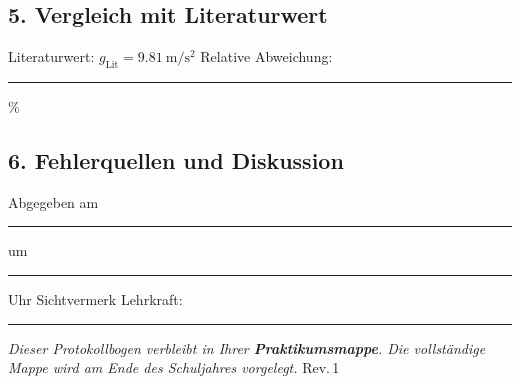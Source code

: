 \documentclass[11pt,a4paper]{scrartcl}
\begin{document}
	\vspace{0.3cm}
	
	\subsection*{5. Vergleich mit Literaturwert}
	
	Literaturwert: $g_{\text{Lit}} = \SI{9,81}{\metre\per\second\squared}$ \hfill Relative Abweichung: \rule{3cm}{0.4pt} \%
	
	\vspace{0.5cm}
	
	\subsection*{6. Fehlerquellen und Diskussion}
	
	\vspace{10cm}
	

	\vspace{0.4cm}
	\begin{tcolorbox}[colback=yellow!8, colframe=black, boxrule=0.6pt, title={\faIcon{check-circle}\enspace Abgabevermerk -- wird vor Ort ausgefüllt}, fonttitle=\bfseries]
		Abgegeben am \rule{2.8cm}{0.4pt} \enspace um \rule{2cm}{0.4pt} Uhr \hfill Sichtvermerk Lehrkraft: \rule{3.5cm}{0.4pt}

		\vspace{0.15cm}
		{\small\textit{Dieser Protokollbogen verbleibt in Ihrer \textbf{Praktikumsmappe}. Die vollständige Mappe wird am Ende des Schuljahres vorgelegt.} \hfill \scriptsize Rev.\,1}
	\end{tcolorbox}
\end{document}
